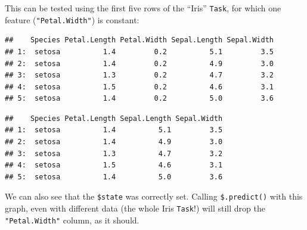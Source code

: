 \documentclass[
]{scrbook}
\newenvironment{Shaded}{\begin{snugshade}}{\end{snugshade}}
\newcommand{\DecValTok}[1]{\textcolor[rgb]{0.00,0.00,0.81}{#1}}
\newcommand{\FunctionTok}[1]{\textcolor[rgb]{0.00,0.00,0.00}{#1}}
\newcommand{\NormalTok}[1]{#1}
\newcommand{\OtherTok}[1]{\textcolor[rgb]{0.56,0.35,0.01}{#1}}
\newcommand{\SpecialCharTok}[1]{\textcolor[rgb]{0.00,0.00,0.00}{#1}}
\renewenvironment{Shaded} {\begin{snugshade}\small} {\end{snugshade}}
\begin{document}
This can be tested using the first five rows of the ``Iris'' \texttt{Task}, for which one feature (\texttt{"Petal.Width"}) is constant:

\begin{Shaded}
\end{Shaded}

\begin{verbatim}
##    Species Petal.Length Petal.Width Sepal.Length Sepal.Width
## 1:  setosa          1.4         0.2          5.1         3.5
## 2:  setosa          1.4         0.2          4.9         3.0
## 3:  setosa          1.3         0.2          4.7         3.2
## 4:  setosa          1.5         0.2          4.6         3.1
## 5:  setosa          1.4         0.2          5.0         3.6
\end{verbatim}

\begin{Shaded}
\end{Shaded}

\begin{verbatim}
##    Species Petal.Length Sepal.Length Sepal.Width
## 1:  setosa          1.4          5.1         3.5
## 2:  setosa          1.4          4.9         3.0
## 3:  setosa          1.3          4.7         3.2
## 4:  setosa          1.5          4.6         3.1
## 5:  setosa          1.4          5.0         3.6
\end{verbatim}

We can also see that the \texttt{\$state} was correctly set.
Calling \texttt{\$.predict()} with this graph, even with different data (the whole Iris \texttt{Task}!) will still drop the \texttt{"Petal.Width"} column, as it should.
\end{document}
